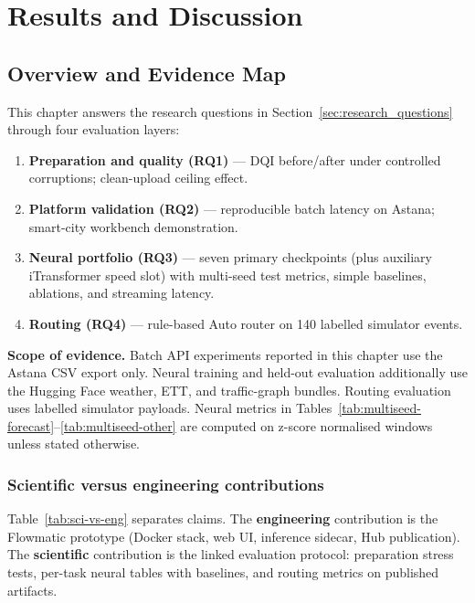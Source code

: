%
%
\chapter{Results and Discussion}
\label{chap:results}
\setlength{\parskip}{0.7em}

\section{Overview and Evidence Map}
\label{sec:exp_overview}

This chapter answers the research questions in Section~\ref{sec:research_questions} through four evaluation layers:
\begin{enumerate}
  \item \textbf{Preparation and quality (RQ1)} --- DQI before/after under controlled corruptions; clean-upload ceiling effect.
  \item \textbf{Platform validation (RQ2)} --- reproducible batch latency on Astana; smart-city workbench demonstration.
  \item \textbf{Neural portfolio (RQ3)} --- seven primary checkpoints (plus auxiliary iTransformer speed slot) with multi-seed test metrics, simple baselines, ablations, and streaming latency.
  \item \textbf{Routing (RQ4)} --- rule-based Auto router on 140 labelled simulator events.
\end{enumerate}

\textbf{Scope of evidence.} Batch API experiments reported in this chapter use the Astana CSV export only. Neural training and held-out evaluation additionally use the Hugging Face weather, ETT, and traffic-graph bundles. Routing evaluation uses labelled simulator payloads. Neural metrics in Tables~\ref{tab:multiseed-forecast}--\ref{tab:multiseed-other} are computed on z-score normalised windows unless stated otherwise.

\subsection{Scientific versus engineering contributions}

Table~\ref{tab:sci-vs-eng} separates claims. The \textbf{engineering} contribution is the Flowmatic prototype (Docker stack, web UI, inference sidecar, Hub publication). The \textbf{scientific} contribution is the linked evaluation protocol: preparation stress tests, per-task neural tables with baselines, and routing metrics on published artifacts.

